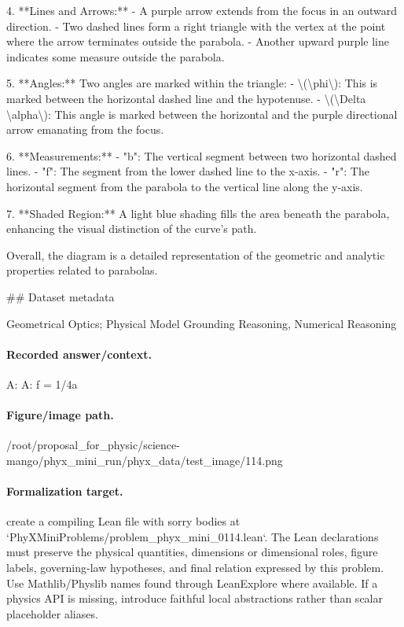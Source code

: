 4. **Lines and Arrows:** 
   - A purple arrow extends from the focus in an outward direction.
   - Two dashed lines form a right triangle with the vertex at the point where the arrow terminates outside the parabola.
   - Another upward purple line indicates some measure outside the parabola.

5. **Angles:** Two angles are marked within the triangle:
   - \textbackslash{}(\textbackslash{}phi\textbackslash{}): This is marked between the horizontal dashed line and the hypotenuse.
   - \textbackslash{}(\textbackslash{}Delta \textbackslash{}alpha\textbackslash{}): This angle is marked between the horizontal and the purple directional arrow emanating from the focus.

6. **Measurements:** 
   - "b": The vertical segment between two horizontal dashed lines.
   - "f": The segment from the lower dashed line to the x-axis.
   - "r": The horizontal segment from the parabola to the vertical line along the y-axis.

7. **Shaded Region:** A light blue shading fills the area beneath the parabola, enhancing the visual distinction of the curve's path.

Overall, the diagram is a detailed representation of the geometric and analytic properties related to parabolas.

\#\# Dataset metadata

Geometrical Optics; Physical Model Grounding Reasoning, Numerical Reasoning

\paragraph{Recorded answer/context.}
A: A: f = 1/4a

\paragraph{Figure/image path.}
/root/proposal\_for\_physic/science-mango/phyx\_mini\_run/phyx\_data/test\_image/114.png

\paragraph{Formalization target.}
create a compiling Lean file with sorry bodies at `PhyXMiniProblems/problem\_phyx\_mini\_0114.lean`. The Lean declarations must preserve the physical quantities, dimensions or dimensional roles, figure labels, governing-law hypotheses, and final relation expressed by this problem.
Use Mathlib/Physlib names found through LeanExplore where available. If a physics API is missing, introduce faithful local abstractions rather than scalar placeholder aliases.

